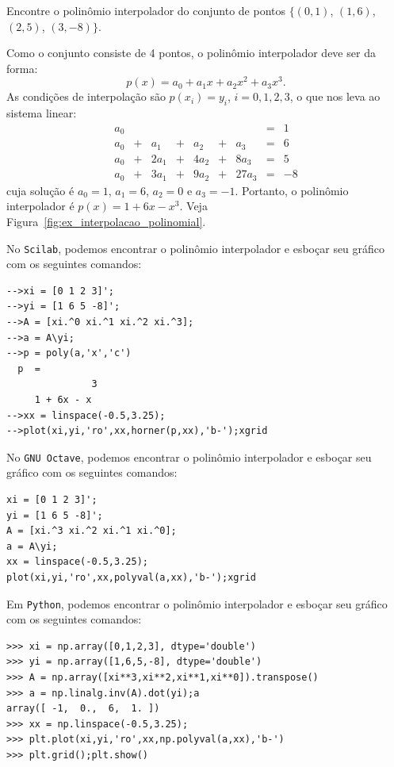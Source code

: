 \begin{ex}\label{ex:interpolacao_polinomial} Encontre o polinômio interpolador do conjunto de pontos $\{(0, 1)$, $(1, 6)$, $(2, 5)$, $(3, -8)\}$.
\end{ex}
\begin{sol}
Como o conjunto consiste de 4 pontos, o polinômio interpolador deve ser da forma:
\begin{equation}
  p(x) = a_0 + a_1x + a_2x^2 + a_3x^3.
\end{equation}
As condições de interpolação são $p(x_i) = y_i$, $i = 0, 1, 2, 3$, o que nos leva ao sistema linear:
\begin{equation}
  \begin{array}{lclclclcl}
    a_0& & & & & & &=&1\\
    a_0&+& a_1&+& a_2&+&  a_3&=&6\\
    a_0&+&2a_1&+&4a_2&+& 8a_3&=&5\\
    a_0&+&3a_1&+&9a_2&+&27a_3&=&-8
  \end{array}
\end{equation}
cuja solução é $a_0=1$, $a_1=6$, $a_2=0$ e $a_3=-1$. Portanto, o polinômio interpolador é $p(x)=1+6x-x^3$. Veja Figura~\ref{fig:ex_interpolacao_polinomial}.

\ifisscilab
No \verb+Scilab+, podemos encontrar o polinômio interpolador e esboçar seu gráfico com os seguintes comandos:
\begin{verbatim}
-->xi = [0 1 2 3]';
-->yi = [1 6 5 -8]';
-->A = [xi.^0 xi.^1 xi.^2 xi.^3];
-->a = A\yi;
-->p = poly(a,'x','c')
  p  =
               3
     1 + 6x - x
-->xx = linspace(-0.5,3.25);
-->plot(xi,yi,'ro',xx,horner(p,xx),'b-');xgrid
\end{verbatim}
\fi
\ifisoctave
No \verb+GNU Octave+, podemos encontrar o polinômio interpolador e esboçar seu gráfico com os seguintes comandos:
\begin{verbatim}
xi = [0 1 2 3]';
yi = [1 6 5 -8]';
A = [xi.^3 xi.^2 xi.^1 xi.^0];
a = A\yi;
xx = linspace(-0.5,3.25);
plot(xi,yi,'ro',xx,polyval(a,xx),'b-');xgrid
\end{verbatim}
\fi
\ifispython
Em \verb+Python+, podemos encontrar o polinômio interpolador e esboçar seu gráfico com os seguintes comandos:
\begin{verbatim}
>>> xi = np.array([0,1,2,3], dtype='double')
>>> yi = np.array([1,6,5,-8], dtype='double')
>>> A = np.array([xi**3,xi**2,xi**1,xi**0]).transpose()
>>> a = np.linalg.inv(A).dot(yi);a
array([ -1,  0.,  6,  1. ])
>>> xx = np.linspace(-0.5,3.25);
>>> plt.plot(xi,yi,'ro',xx,np.polyval(a,xx),'b-')
>>> plt.grid();plt.show()
\end{verbatim}
\fi
\end{sol}


